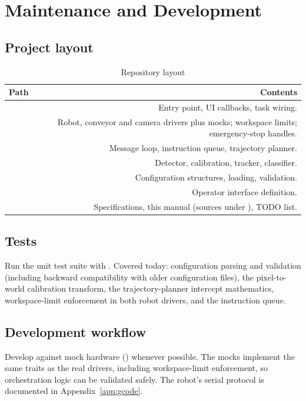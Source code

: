 \chapter{Maintenance and Development}

\section{Project layout}
%
\begin{table}[h]
  \centering
  \begin{tabularx}{\textwidth}{lD}
    \toprule
    \textbf{Path} & \textbf{Contents} \\
    \midrule
     & Entry point, UI callbacks, task wiring. \\
     & Robot, conveyor and camera drivers plus mocks;
      workspace limits; emergency-stop handles. \\
     & Message loop, instruction queue, trajectory
      planner. \\
     & Detector, calibration, tracker, classifier. \\
     & Configuration structures, loading,
      validation. \\
     & Operator interface definition. \\
     & Specifications, this manual (sources under
      ), TODO list. \\
    \bottomrule
  \end{tabularx}
  \caption{Repository layout}
\end{table}

\section{Tests}
%
Run the unit test suite with . Covered today:
configuration parsing and validation (including backward compatibility
with older configuration files), the pixel-to-world calibration transform,
the trajectory-planner intercept mathematics, workspace-limit enforcement
in both robot drivers, and the instruction queue.

\section{Development workflow}
%
Develop against mock hardware () whenever possible. The mocks
implement the same traits as the real drivers, including workspace-limit
enforcement, so orchestration logic can be validated safely. The robot's
serial protocol is documented in Appendix~\ref{app:gcode}.

